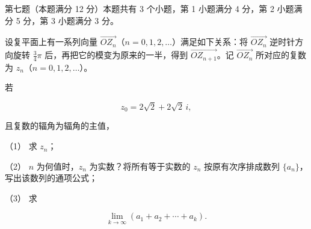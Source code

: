 \begin{question}

第七题（本题满分 12 分）本题共有 3 个小题，第 1 小题满分 4 分，第 2 小题满分 5 分，第 3 小题满分 3 分。

设复平面上有一系列向量 $\overrightarrow{OZ_n}$（$n=0,1,2,\ldots$）满足如下关系：将 $\overrightarrow{OZ_n}$ 逆时针方向旋转 $\frac34\pi$ 后，再把它的模变为原来的一半，得到 $\overrightarrow{OZ_{n+1}}$。记 $\overrightarrow{OZ_n}$ 所对应的复数为 $z_n$（$n=0,1,2,\ldots$）。

若

\nopagebreak[4]
\[
z_0=2\sqrt2+2\sqrt2\,i,
\]

且复数的辐角为辐角的主值，

（1） 求 $z_n$；

（2） $n$ 为何值时，$z_n$ 为实数？将所有等于实数的 $z_n$ 按原有次序排成数列 $\{a_n\}$，写出该数列的通项公式；

（3） 求

\nopagebreak[4]
\[
\lim_{k\to\infty}(a_1+a_2+\cdots+a_k).
\]

\end{question}